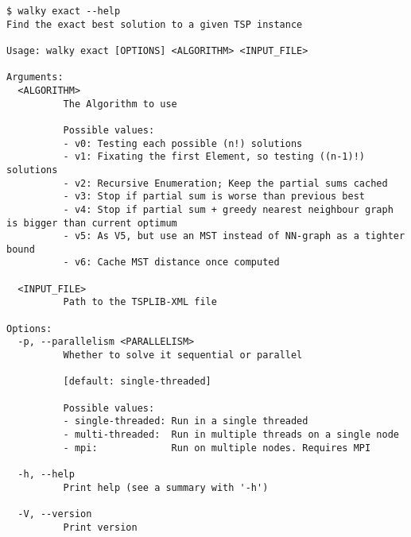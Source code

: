 \begin{verbatim}
$ walky exact --help
Find the exact best solution to a given TSP instance

Usage: walky exact [OPTIONS] <ALGORITHM> <INPUT_FILE>

Arguments:
  <ALGORITHM>
          The Algorithm to use

          Possible values:
          - v0: Testing each possible (n!) solutions
          - v1: Fixating the first Element, so testing ((n-1)!) solutions
          - v2: Recursive Enumeration; Keep the partial sums cached
          - v3: Stop if partial sum is worse than previous best
          - v4: Stop if partial sum + greedy nearest neighbour graph is bigger than current optimum
          - v5: As V5, but use an MST instead of NN-graph as a tighter bound
          - v6: Cache MST distance once computed

  <INPUT_FILE>
          Path to the TSPLIB-XML file

Options:
  -p, --parallelism <PARALLELISM>
          Whether to solve it sequential or parallel
          
          [default: single-threaded]

          Possible values:
          - single-threaded: Run in a single threaded
          - multi-threaded:  Run in multiple threads on a single node
          - mpi:             Run on multiple nodes. Requires MPI

  -h, --help
          Print help (see a summary with '-h')

  -V, --version
          Print version
\end{verbatim}


